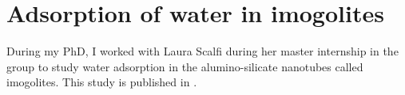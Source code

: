 \documentclass[thesis]{subfiles}
\begin{document}
%
%
%

\newpage
\section{Adsorption of water in imogolites}

During my PhD, I worked with Laura Scalfi during her master internship in the
group to study water adsorption in the alumino-silicate nanotubes called
imogolites. This study is published in \cite{Scalfi2018}.
\end{document}
